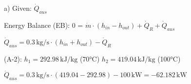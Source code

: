 a) Given: \( \dot{Q}_{aus} \)  

Energy Balance (EB):  
0 = \( \dot{m} \cdot (h_{in} - h_{out}) + \dot{Q}_R + \dot{Q}_{aus} \)  

\( \dot{Q}_{aus} = 0.3 \, \text{kg/s} \cdot (h_{in} + h_{out}) - \dot{Q}_R \)  

(A-2):  
\( h_1 = 292.98 \, \text{kJ/kg} \) (70°C)  
\( h_2 = 419.04 \, \text{kJ/kg} \) (100°C)  

\( \dot{Q}_{aus} = 0.3 \, \text{kg/s} \cdot (419.04 - 292.98) - 100 \, \text{kW} = -62.182 \, \text{kW} \)